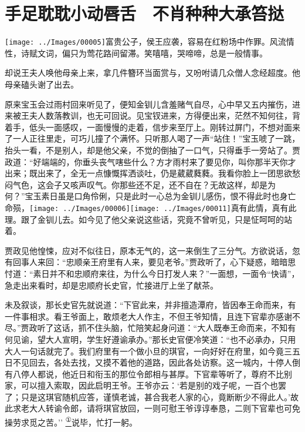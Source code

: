 

\chapter{手足耽耽小动唇舌　不肖种种大承笞挞}\label{part0037_split_000.htmlux5cux23calibre_pb_0}

{\texttt{[image: ../Images/00005]}富贵公子，侯王应袭，容易在红粉场中作罪。风流情性，诗赋文词，偏只为莺花路间留滞。笑嘻嘻，哭啼啼，总是一般情事。}

却说王夫人唤他母亲上来，拿几件簪环当面赏与，又吩咐请几众僧人念经超度。他母亲磕头谢了出去。

原来宝玉会过雨村回来听见了，便知金钏儿含羞赌气自尽，心中早又五内摧伤，进来被王夫人数落教训，也无可回说。见宝钗进来，方得便出来，茫然不知何往，背着手，低头一面感叹，一面慢慢的走着，信步来至厅上。刚转过屏门，不想对面来了一人正往里走，可巧儿撞了个满怀。只听那人喝了一声``站住！''宝玉唬了一跳，抬头一看，不是别人，却是他父亲，不觉的倒抽了一口气，只得垂手一旁站了。贾政道：``好端端的，你垂头丧气嗐些什么？方才雨村来了要见你，叫你那半天你才出来；既出来了，全无一点慷慨挥洒谈吐，仍是葳葳蕤蕤。我看你脸上一团思欲愁闷气色，这会子又咳声叹气。你那些还不足，还不自在？无故这样，却是为何？''宝玉素日虽是口角伶俐，只是此时一心总为金钏儿感伤，恨不得此时也身亡命殒，{\texttt{[image: ../Images/00006]}\texttt{[image: ../Images/00011]}\footnotesize \kaishu 真有此情，真有此理。}跟了金钏儿去。如今见了他父亲说这些话，究竟不曾听见，只是怔呵呵的站着。

贾政见他惶悚，应对不似往日，原本无气的，这一来倒生了三分气。方欲说话，忽有回事人来回：``忠顺亲王府里有人来，要见老爷。''贾政听了，心下疑惑，暗暗思忖道：``素日并不和忠顺府来往，为什么今日打发人来？''一面想，一面令``快请''，急走出来看时，却是忠顺府长史官，忙接进厅上坐了献茶。

未及叙谈，那长史官先就说道：``下官此来，并非擅造潭府，皆因奉王命而来，有一件事相求。看王爷面上，敢烦老大人作主，不但王爷知情，且连下官辈亦感谢不尽。''贾政听了这话，抓不住头脑，忙陪笑起身问道：``大人既奉王命而来，不知有何见谕，望大人宣明，学生好遵谕承办。''那长史官便冷笑道：``也不必承办，只用大人一句话就完了。我们府里有一个做小旦的琪官，一向好好在府里，如今竟三五日不见回去，各处去找，又摸不着他的道路，因此各处访察。这一城内，十停人倒有八停人都说，他近日和衔玉的那位令郎相与甚厚。下官辈等听了，尊府不比别家，可以擅入索取，因此启明王爷。王爷亦云：`若是别的戏子呢，一百个也罢了；只是这琪官随机应答，谨慎老诚，甚合我老人家的心，竟断断少不得此人。'故此求老大人转谕令郎，请将琪官放回，一则可慰王爷谆谆奉恳，二则下官辈也可免操劳求觅之苦。''{
}\href{../Text/part0037_split_000.html\#lnkback_1_a}{\textsuperscript{①}}说毕，忙打一躬。

